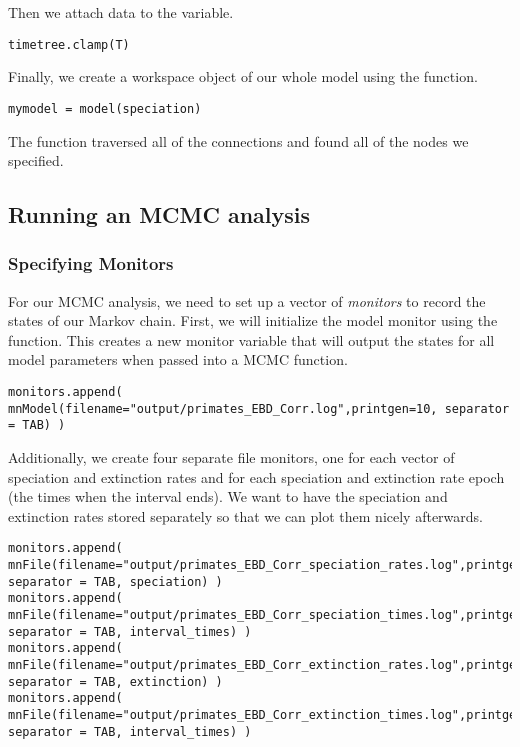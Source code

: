Then we attach data to the  variable.
{\tt \begin{snugshade*}
\begin{lstlisting}
timetree.clamp(T)
\end{lstlisting}
\end{snugshade*}}

Finally, we create a workspace object of our whole model using the  function. 
{\tt \begin{snugshade*}
\begin{lstlisting}
mymodel = model(speciation)
\end{lstlisting}
\end{snugshade*}}

The  function traversed all of the connections and found all of the nodes we specified. 


\subsection{Running an MCMC analysis}

\subsubsection{Specifying Monitors}

For our MCMC analysis, we need to set up a vector of \textit{monitors} to record the states of our Markov chain. 
First, we will initialize the model monitor using the  function. This creates a new monitor variable that will output the states for all model parameters when passed into a MCMC function. 
{\tt \begin{snugshade*}
\begin{lstlisting}
monitors.append( mnModel(filename="output/primates_EBD_Corr.log",printgen=10, separator = TAB) )
\end{lstlisting}
\end{snugshade*}}

Additionally, we create four separate file monitors, one for each vector of speciation and extinction rates and for each speciation and extinction rate epoch (\IE the times when the interval ends).
We want to have the speciation and extinction rates stored separately so that we can plot them nicely afterwards.
{\tt \begin{snugshade*}
\begin{lstlisting}
monitors.append( mnFile(filename="output/primates_EBD_Corr_speciation_rates.log",printgen=10, separator = TAB, speciation) )
monitors.append( mnFile(filename="output/primates_EBD_Corr_speciation_times.log",printgen=10, separator = TAB, interval_times) )
monitors.append( mnFile(filename="output/primates_EBD_Corr_extinction_rates.log",printgen=10, separator = TAB, extinction) )
monitors.append( mnFile(filename="output/primates_EBD_Corr_extinction_times.log",printgen=10, separator = TAB, interval_times) )
\end{lstlisting}
\end{snugshade*}}


